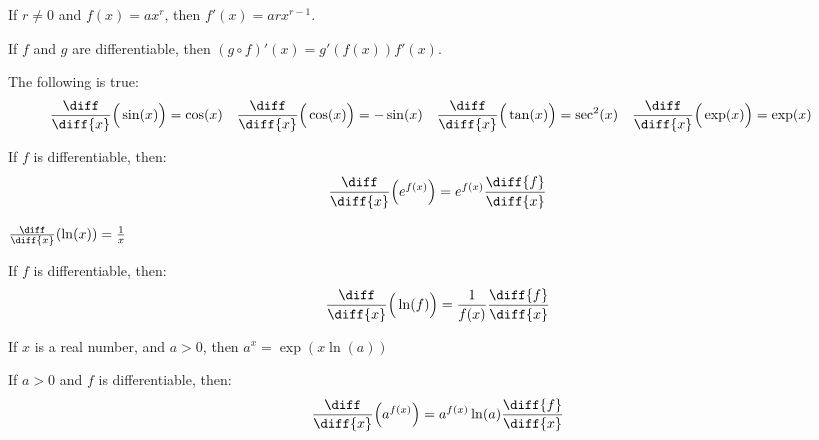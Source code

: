 \documentclass[crop=false,class=article,oneside]{standalone}
\begin{document}
        \begin{theorem}
            If $r\ne{0}$ and $f(x)=ax^{r}$, then
            $f'(x)=arx^{r-1}$.
        \end{theorem}
        \begin{theorem}
            If $f$ and $g$ are differentiable, then
            $(g\circ{f})'(x)=g'(f(x))f'(x)$.
        \end{theorem}
        \begin{theorem}
            The following is true:
            \begin{align*}
                \frac{\diff}{\diff{x}}\Big(\sin(x)\Big)
                &=\cos(x)
                &
                \frac{\diff}{\diff{x}}\Big(\cos(x)\Big)
                &=-\sin(x)
                &
                \frac{\diff}{\diff{x}}\Big(\tan(x)\Big)
                &=\sec^{2}(x)
                &
                \frac{\diff}{\diff{x}}\Big(\exp(x)\Big)
                &=\exp(x)
            \end{align*}
        \end{theorem}
        \begin{theorem}
            If $f$ is differentiable, then:
            \begin{equation*}
                \frac{\diff}{\diff{x}}\Big(e^{f(x)}\Big)
                =e^{f(x)}\frac{\diff{f}}{\diff{x}}
            \end{equation*}
        \end{theorem}
        \begin{theorem}
            $\frac{\diff}{\diff{x}}(\ln(x))=\frac{1}{x}$
        \end{theorem}
        \begin{theorem}
            If $f$ is differentiable, then:
            \begin{equation*}
                \frac{\diff}{\diff{x}}\Big(\ln(f)\Big)
                =\frac{1}{f(x)}\frac{\diff{f}}{\diff{x}}
            \end{equation*}
        \end{theorem}
        \begin{theorem}
            If $x$ is a real number, and $a>0$, then
            $a^{x}=\exp(x\ln(a))$
        \end{theorem}
        \begin{theorem}
            If $a>0$ and $f$ is differentiable, then:
            \begin{equation*}
                \frac{\diff}{\diff{x}}\Big(a^{f(x)}\Big)
                =a^{f(x)}\ln(a)\frac{\diff{f}}{\diff{x}}
            \end{equation*}
        \end{theorem}
\end{document}
